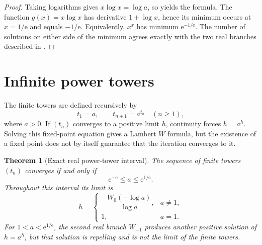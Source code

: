 \documentclass[11pt,openany]{book}
\newcommand{\e}{\mathrm{e}}
\theoremstyle{plain}
\newtheorem{theorem}{Theorem}[chapter]
\theoremstyle{definition}
\theoremstyle{remark}
\begin{document}
\begin{proof}
Taking logarithms gives \(x\log x=\log a\), so  yields the
formula.  The function \(g(x)=x\log x\) has derivative \(1+\log x\), hence its
minimum occurs at \(x=1/\e\) and equals \(-1/\e\).  Equivalently,
\(x^x\) has minimum \(\e^{-1/\e}\).  The number of solutions on either side of
the minimum agrees exactly with the two real branches described in
.
\end{proof}

\section{Infinite power towers}
The finite towers are defined recursively by
\[
       t_1=a,\qquad t_{n+1}=a^{t_n}\quad(n\ge1),
\]
where \(a>0\).  If \((t_n)\) converges to a positive limit \(h\), continuity
forces \(h=a^h\).  Solving this fixed-point equation gives a Lambert \(W\)
formula, but the existence of a fixed point does not by itself guarantee that
the iteration converges to it.

\begin{theorem}[Exact real power-tower interval]\label{thm:powertower}
The sequence of finite towers \((t_n)\) converges if and only if
\[
                 \e^{-\e}\le a\le \e^{1/\e}.
\]
Throughout this interval its limit is
\begin{equation}\label{eq:powertower}
 h=\begin{cases}
  -\dfrac{W_0(-\log a)}{\log a},&a\ne1,\\[8pt]
  1,&a=1.
 \end{cases}
\end{equation}
For \(1<a<\e^{1/\e}\), the second real branch \(W_{-1}\) produces another
positive solution of \(h=a^h\), but that solution is repelling and is not the
limit of the finite towers.
\end{theorem}
\end{document}
